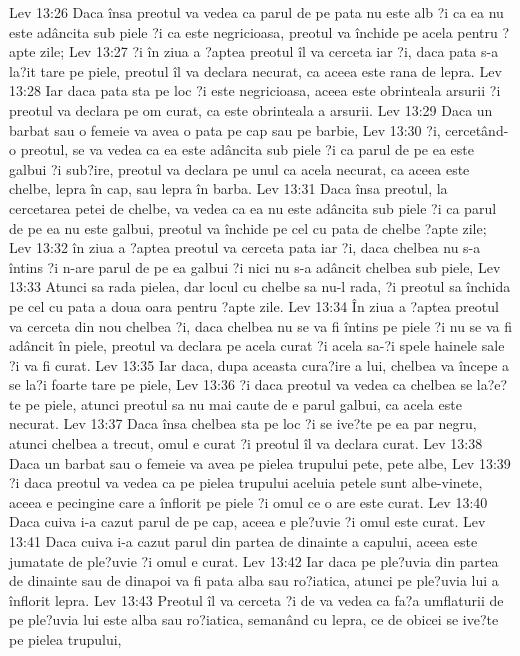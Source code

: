 Lev 13:26  Daca însa preotul va vedea ca parul de pe pata nu este alb ?i ca ea nu este adâncita sub piele ?i ca este negricioasa, preotul va închide pe acela pentru ?apte zile;
Lev 13:27  ?i în ziua a ?aptea preotul îl va cerceta iar ?i, daca pata s-a la?it tare pe piele, preotul îl va declara necurat, ca aceea este rana de lepra.
Lev 13:28  Iar daca pata sta pe loc ?i este negricioasa, aceea este obrinteala arsurii ?i preotul va declara pe om curat, ca este obrinteala a arsurii.
Lev 13:29  Daca un barbat sau o femeie va avea o pata pe cap sau pe barbie,
Lev 13:30  ?i, cercetând-o preotul, se va vedea ca ea este adâncita sub piele ?i ca parul de pe ea este galbui ?i sub?ire, preotul va declara pe unul ca acela necurat, ca aceea este chelbe, lepra în cap, sau lepra în barba.
Lev 13:31  Daca însa preotul, la cercetarea petei de chelbe, va vedea ca ea nu este adâncita sub piele ?i ca parul de pe ea nu este galbui, preotul va închide pe cel cu pata de chelbe ?apte zile;
Lev 13:32  în ziua a ?aptea preotul va cerceta pata iar ?i, daca chelbea nu s-a întins ?i n-are parul de pe ea galbui ?i nici nu s-a adâncit chelbea sub piele,
Lev 13:33  Atunci sa rada pielea, dar locul cu chelbe sa nu-l rada, ?i preotul sa închida pe cel cu pata a doua oara pentru ?apte zile.
Lev 13:34  În ziua a ?aptea preotul va cerceta din nou chelbea ?i, daca chelbea nu se va fi întins pe piele ?i nu se va fi adâncit în piele, preotul va declara pe acela curat ?i acela sa-?i spele hainele sale ?i va fi curat.
Lev 13:35  Iar daca, dupa aceasta cura?ire a lui, chelbea va începe a se la?i foarte tare pe piele,
Lev 13:36  ?i daca preotul va vedea ca chelbea se la?e?te pe piele, atunci preotul sa nu mai caute de e parul galbui, ca acela este necurat.
Lev 13:37  Daca însa chelbea sta pe loc ?i se ive?te pe ea par negru, atunci chelbea a trecut, omul e curat ?i preotul îl va declara curat.
Lev 13:38  Daca un barbat sau o femeie va avea pe pielea trupului pete, pete albe,
Lev 13:39  ?i daca preotul va vedea ca pe pielea trupului aceluia petele sunt albe-vinete, aceea e pecingine care a înflorit pe piele ?i omul ce o are este curat.
Lev 13:40  Daca cuiva i-a cazut parul de pe cap, aceea e ple?uvie ?i omul este curat.
Lev 13:41  Daca cuiva i-a cazut parul din partea de dinainte a capului, aceea este jumatate de ple?uvie ?i omul e curat.
Lev 13:42  Iar daca pe ple?uvia din partea de dinainte sau de dinapoi va fi pata alba sau ro?iatica, atunci pe ple?uvia lui a înflorit lepra.
Lev 13:43  Preotul îl va cerceta ?i de va vedea ca fa?a umflaturii de pe ple?uvia lui este alba sau ro?iatica, semanând cu lepra, ce de obicei se ive?te pe pielea trupului,
